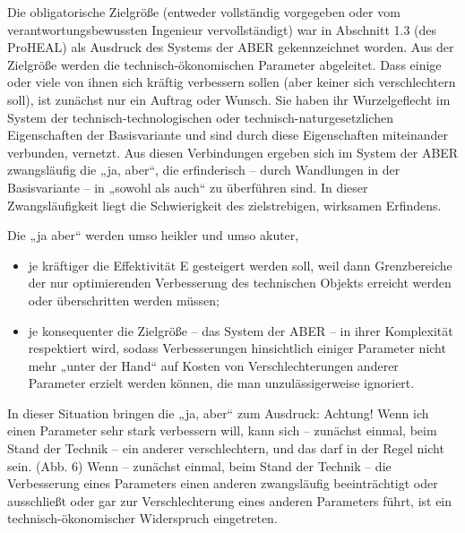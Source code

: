 \documentclass[12pt,a4paper]{article}
\begin{document}
Die obligatorische Zielgröße (entweder vollständig vorgegeben oder vom
verantwortungsbewussten Ingenieur vervollständigt) war in Abschnitt 1.3 (des
ProHEAL) als Ausdruck des Systems der ABER gekennzeichnet worden. Aus der
Zielgröße werden die technisch-ökonomischen Parameter abgeleitet. Dass einige
oder viele von ihnen sich kräftig verbessern sollen (aber keiner sich
verschlechtern soll), ist zunächst nur ein Auftrag oder Wunsch. Sie haben ihr
Wurzelgeflecht im System der technisch-technologischen oder
technisch-naturgesetzlichen Eigenschaften der Basisvariante und sind durch
diese Eigenschaften miteinander verbunden, vernetzt. Aus diesen Verbindungen
ergeben sich im System der ABER zwangsläufig die „ja, aber“, die erfinderisch
-- durch Wandlungen in der Basisvariante -- in „sowohl als auch“ zu überführen
sind. In dieser Zwangsläufigkeit liegt die Schwierigkeit des zielstrebigen,
wirksamen Erfindens.

Die „ja aber“ werden umso heikler und umso akuter,
\begin{itemize}
\item je kräftiger die Effektivität E gesteigert werden soll, weil dann
  Grenzbereiche der nur optimierenden Verbesserung des technischen Objekts
  erreicht werden oder überschritten werden müssen; 
\item je konsequenter die Zielgröße – das System der ABER -- in ihrer
  Komplexität respektiert wird, sodass Verbesserungen hinsichtlich einiger
  Parameter nicht mehr „unter der Hand“ auf Kosten von Verschlechterungen
  anderer Parameter erzielt werden können, die man unzulässigerweise ignoriert.
\end{itemize}
In dieser Situation bringen die „ja, aber“ zum Ausdruck: Achtung! Wenn ich
einen Parameter sehr stark verbessern will, kann sich – zunächst einmal, beim
Stand der Technik – ein anderer verschlechtern, und das darf in der Regel nicht
sein. (Abb. 6) Wenn -- zunächst einmal, beim Stand der Technik – die
Verbesserung eines Parameters einen anderen zwangsläufig beeinträchtigt oder
ausschließt oder gar zur Verschlechterung eines anderen Parameters führt, ist
ein technisch-ökonomischer Widerspruch eingetreten.
\end{document}

